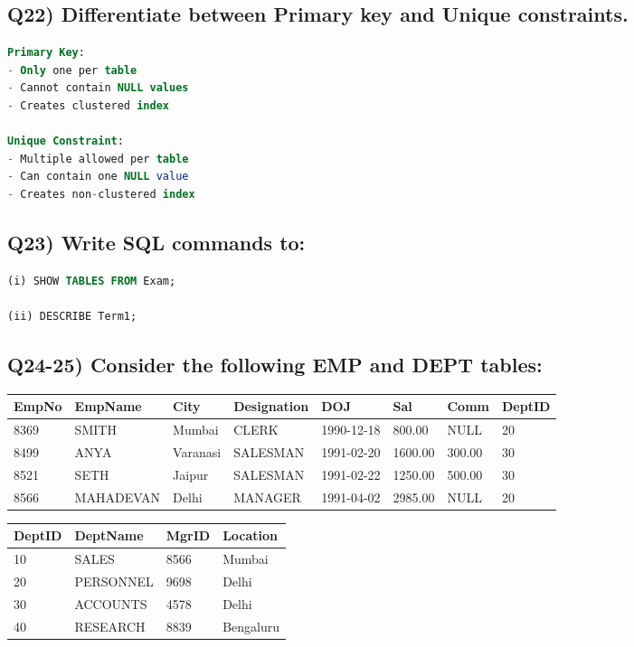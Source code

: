 \documentclass{article}
\begin{document}
\subsection*{Q22) Differentiate between Primary key and Unique constraints.}
\begin{lstlisting}[language=SQL]
Primary Key:
- Only one per table
- Cannot contain NULL values
- Creates clustered index

Unique Constraint:
- Multiple allowed per table
- Can contain one NULL value
- Creates non-clustered index
\end{lstlisting}

\subsection*{Q23) Write SQL commands to:}
\begin{lstlisting}[language=SQL]
(i) SHOW TABLES FROM Exam;

(ii) DESCRIBE Term1;
\end{lstlisting}

\subsection*{Q24-25) Consider the following EMP and DEPT tables:}

\begin{tabular}{|l|l|l|l|l|l|l|l|}
\hline
EmpNo & EmpName & City & Designation & DOJ & Sal & Comm & DeptID \\
\hline
8369 & SMITH & Mumbai & CLERK & 1990-12-18 & 800.00 & NULL & 20 \\
8499 & ANYA & Varanasi & SALESMAN & 1991-02-20 & 1600.00 & 300.00 & 30 \\
8521 & SETH & Jaipur & SALESMAN & 1991-02-22 & 1250.00 & 500.00 & 30 \\
8566 & MAHADEVAN & Delhi & MANAGER & 1991-04-02 & 2985.00 & NULL & 20 \\
\hline
\end{tabular}

\begin{tabular}{|l|l|l|l|}
\hline
DeptID & DeptName & MgrID & Location \\
\hline
10 & SALES & 8566 & Mumbai \\
20 & PERSONNEL & 9698 & Delhi \\
30 & ACCOUNTS & 4578 & Delhi \\
40 & RESEARCH & 8839 & Bengaluru \\
\hline
\end{tabular}
\end{document}
